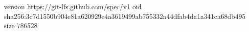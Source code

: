 version https://git-lfs.github.com/spec/v1
oid sha256:3c7d1550b904e81a620929e4a3619499ab755332a44dfab4da1a341ca68db495
size 786528
